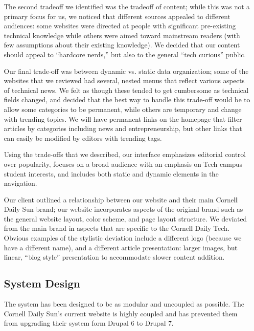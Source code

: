 \documentclass[11pt]{article} %
\begin{document}
The second tradeoff we identified was the tradeoff of content; while this was not a primary focus for us, we noticed that different sources appealed to different audiences: some websites were directed at people with significant pre-existing technical knowledge while others were aimed toward mainstream readers (with few assumptions about their existing knowledge). We decided that our content should appeal to “hardcore nerds,” but also to the general “tech curious” public.
                
Our final trade-off was between dynamic vs. static data organization; some of the websites that we reviewed had several, nested menus that reflect various aspects of technical news. We felt as though these tended to get cumbersome as technical fields changed, and decided that the best way to handle this trade-off would be to allow some categories to be permanent, while others are temporary and change with trending topics. We will have permanent links on the homepage that filter articles by categories including news and entrepreneurship, but other links that can easily be modified by editors with trending tags.
            
Using the trade-offs that we described, our interface emphasizes editorial control over popularity, focuses on a broad audience with an emphasis on Tech campus student interests, and includes both static and dynamic elements in the navigation.
            
Our client outlined a relationship between our website and their main Cornell Daily Sun brand; our website incorporates aspects of the original brand such as the general website layout, color scheme, and page layout structure. We deviated from the main brand in aspects that are specific to the Cornell Daily Tech. Obvious examples of the stylistic deviation include a different logo (because we have a different name), and a different article presentation: larger images, but linear, “blog style” presentation to accommodate slower content addition. 

\subsection{System Design}

The system has been designed to be as modular and uncoupled as possible. The Cornell Daily Sun’s current website is highly coupled and has prevented them from upgrading their system form Drupal 6 to Drupal 7.
\end{document}
